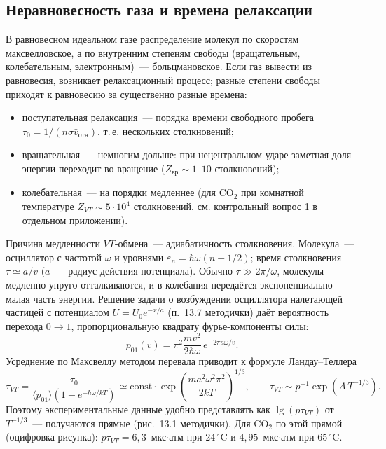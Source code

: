 \documentclass[12pt,a4paper]{article}
\newcommand{\COO}{\mathrm{CO_2}}
\begin{document}
\subsection{Неравновесность газа и времена релаксации}

В равновесном идеальном газе распределение молекул по скоростям
максвелловское, а по внутренним степеням свободы (вращательным,
колебательным, электронным)~--- больцмановское. Если газ вывести из
равновесия, возникает релаксационный процесс; разные степени свободы
приходят к равновесию за существенно разные времена:
\begin{itemize}
    \item поступательная релаксация~--- порядка времени свободного
          пробега $\tau_0 = 1/(n\sigma \bar v_{\text{отн}})$, т.\,е.
          нескольких столкновений;
    \item вращательная~--- немногим дольше: при нецентральном ударе
          заметная доля энергии переходит во вращение
          ($Z_{\text{вр}} \sim 1\text{--}10$ столкновений);
    \item колебательная~--- на порядки медленнее (для $\COO$ при
          комнатной температуре $Z_{VT} \sim 5\cdot10^4$ столкновений,
          см. контрольный вопрос 1 в отдельном приложении).
\end{itemize}

Причина медленности $VT$-обмена~--- адиабатичность столкновения.
Молекула~--- осциллятор с частотой $\omega$ и уровнями
$\varepsilon_n = \hbar\omega(n+1/2)$; время столкновения
$\tau \simeq a/v$ ($a$~--- радиус действия потенциала). Обычно
$\tau \gg 2\pi/\omega$, молекулы медленно упруго отталкиваются, и в
колебания передаётся экспоненциально малая часть энергии. Решение
задачи о возбуждении осциллятора налетающей частицей с потенциалом
$U = U_0 e^{-x/a}$ (п.~13.7 методички) даёт вероятность перехода
$0\to1$, пропорциональную квадрату фурье-компоненты силы:
\begin{equation}
    p_{01}(v) = \pi^2 \frac{mv^2}{2\hbar\omega}\, e^{-2\pi a\omega/v}.
\end{equation}
Усреднение по Максвеллу методом перевала приводит к формуле
Ландау--Теллера
\begin{equation}
    \tau_{VT} = \frac{\tau_0}{\langle p_{01}\rangle\left(1-e^{-\hbar\omega/kT}\right)}
    \simeq \mathrm{const}\cdot\exp\left(\frac{m a^2\omega^2\pi^2}{2kT}\right)^{1/3},
    \qquad
    \tau_{VT} \sim p^{-1}\exp\left(A\,T^{-1/3}\right).
    \label{eq:LT}
\end{equation}
Поэтому экспериментальные данные удобно представлять как
$\lg(p\tau_{VT})$ от $T^{-1/3}$~--- получаются прямые
(рис.~13.1 методички). Для $\COO$ по этой прямой (оцифровка рисунка):
$p\tau_{VT} = 6{,}3$~мкс$\cdot$атм при $24\,^\circ$C и
$4{,}95$~мкс$\cdot$атм при $65\,^\circ$C.
\end{document}
